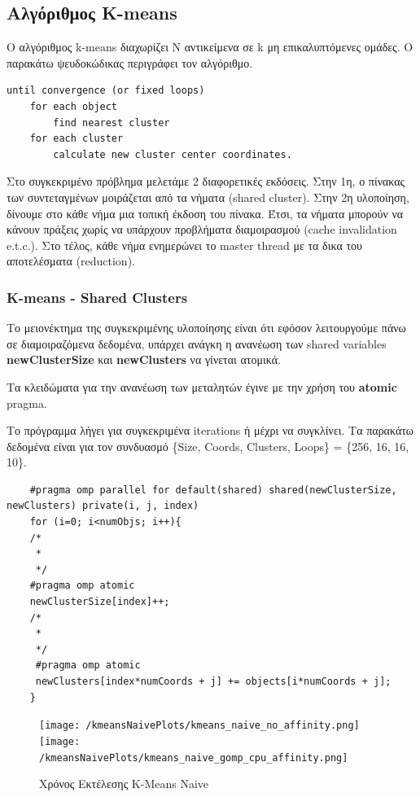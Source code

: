 \documentclass[letterpaper,12pt]{article}
\begin{document}
\subsection{Αλγόριθμος K-means}

Ο αλγόριθμος k-means διαχωρίζει N αντικείμενα σε k μη επικαλυπτόμενες ομάδες. Ο παρακάτω ψευδοκώδικας περιγράφει τον αλγόριθμο.

\begin{lstlisting}
until convergence (or fixed loops)
    for each object
        find nearest cluster
    for each cluster
        calculate new cluster center coordinates.
\end{lstlisting}

Στο συγκεκριμένο πρόβλημα μελετάμε 2 διαφορετικές εκδόσεις. Στην 1η, ο πίνακας των συντεταγμένων μοιράζεται από τα νήματα (shared cluster).
Στην 2η υλοποίηση, δίνουμε στο κάθε νήμα μια τοπική έκδοση του πίνακα. Έτσι, τα νήματα μπορούν να κάνουν πράξεις
χωρίς να υπάρχουν προβλήματα διαμοιρασμού (cache invalidation e.t.c.). Στο τέλος, κάθε νήμα ενημερώνει το
master thread με τα δικα του αποτελέσματα (reduction).

\subsubsection{K-means - Shared Clusters}

Το μειονέκτημα της συγκεκριμένης υλοποίησης είναι ότι εφόσον λειτουργούμε πάνω σε διαμοιραζόμενα δεδομένα, υπάρχει
ανάγκη η ανανέωση των shared variables \textbf{newClusterSize} και \textbf{newClusters} να γίνεται ατομικά.

Τα κλειδώματα για την ανανέωση των μεταλητών έγινε με την χρήση του \textbf{atomic} pragma.

Το πρόγραμμα λήγει για συγκεκριμένα iterations ή μέχρι να συγκλίνει. Τα παρακάτω δεδομένα είναι για τον συνδυασμό
\{Size, Coords, Clusters, Loops\} = \{256, 16, 16, 10\}.

\begin{lstlisting}
    #pragma omp parallel for default(shared) shared(newClusterSize, newClusters) private(i, j, index)
    for (i=0; i<numObjs; i++){
    /*
     *
     */
    #pragma omp atomic
    newClusterSize[index]++;
    /*
     *
     */
     #pragma omp atomic
     newClusters[index*numCoords + j] += objects[i*numCoords + j];
    }
\end{lstlisting}

\begin{figure}[H]
    \centering
    \texttt{[image: /kmeansNaivePlots/kmeans\_naive\_no\_affinity.png]}
    \texttt{[image: /kmeansNaivePlots/kmeans\_naive\_gomp\_cpu\_affinity.png]}
    \caption{Χρόνος Εκτέλεσης K-Means Naive}
    \label{fig:Χρόνος Εκτέλεσης K-Means Naive}
\end{figure}
\end{document}

